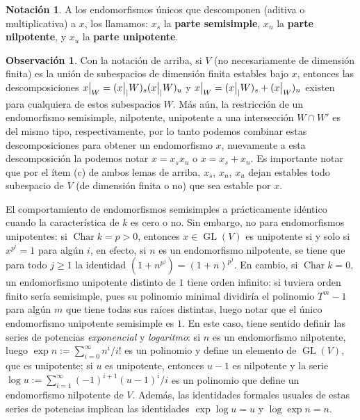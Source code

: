 \documentclass[spanish,10pt]{amsart}
\theoremstyle{definition}
\newtheorem{obs}[theorem]{Observación}
\newtheorem{notation}[theorem]{Notación}
\theoremstyle{remark}
\numberwithin{equation}{section}
\newcommand\rest[2]{{%
  \left.\kern-\nulldelimiterspace %
  #1 %
  \vphantom{\big|} %
  \right|_{#2} %
  }}
\newcommand{\Char}[1]{\operatorname{Char} #1}
\begin{document}
\begin{notation}
A los endomorfismos únicos que descomponen (aditiva o multiplicativa) a $x$, los llamamos: $x_s$ la \textbf{parte semisimple}, $x_n$ la \textbf{parte nilpotente}, y $x_u$ la \textbf{parte unipotente}.
\end{notation}

\begin{obs}
Con la notación de arriba, si $V$ (no necesariamente de dimensión finita) es la unión de subespacios de dimensión finita estables bajo $x$, entonces las descomposiciones $\rest x W = (\rest x | W)_s (\rest x | W)_u$ y $\rest x W = (\rest x | W)_s + (\rest x W)_n$ existen para cualquiera de estos subespacios $W$. Más aún, la restricción de un endomorfismo semisimple, nilpotente, unipotente a una intersección $W \cap W'$ es del mismo tipo, respectivamente, por lo tanto podemos combinar estas descomposiciones para obtener un endomorfismo $x$, nuevamente a esta descomposición la podemos notar $x = x_s x_u$ o $x = x_s + x_n$. Es importante notar que por el ítem (c) de ambos lemas de arriba, $x_s$, $x_n$, $x_u$ dejan estables todo subespacio de $V$ (de dimensión finita o no) que sea estable por $x$.
\end{obs}

El comportamiento de endomorfismos semisimples a prácticamente idéntico cuando la característica de $k$ es cero o no. Sin embargo, no para endomorfismos unipotentes: si $\Char k = p > 0$, entonces $x \in \operatorname{GL} (V)$ es unipotente si y solo si $x^{p^i} = 1$ para algún $i$, en efecto, si $n$ es un endomorfismo nilpotente, se tiene que para todo $j \geq 1$ la identidad $(1+n^{p^j}) = (1 + n)^{p^j}$. En cambio, si $\Char k = 0$,  un endomorfismo unipotente distinto de $1$ tiene orden infinito: si tuviera orden finito sería semisimple, pues su polinomio minimal dividiría el polinomio $T^m - 1$ para algún $m$ que tiene todas sus raíces distintas, luego notar que el único endomorfismo unipotente semisimple es $1$. En este caso, tiene sentido definir las series de potencias \textit{exponencial} y \textit{logaritmo}: si $n$ es un endomorfismo nilpotente, luego $\exp n := \sum_{i = 0}^\infty n^i /i!$ es un polinomio y define un elemento de $\operatorname{GL}(V)$, que es unipotente; si $u$ es unipotente, entonces $u-1$ es nilpotente y la serie $\log u := \sum_{i = 1}^\infty (-1)^{i + 1} (u - 1)^i / i$ es un polinomio que define un endomorfismo nilpotente de $V$. Además, las identidades formales usuales de estas series de potencias implican las identidades $\exp \log u = u$ y $\log \exp n = n$.
\end{document}
